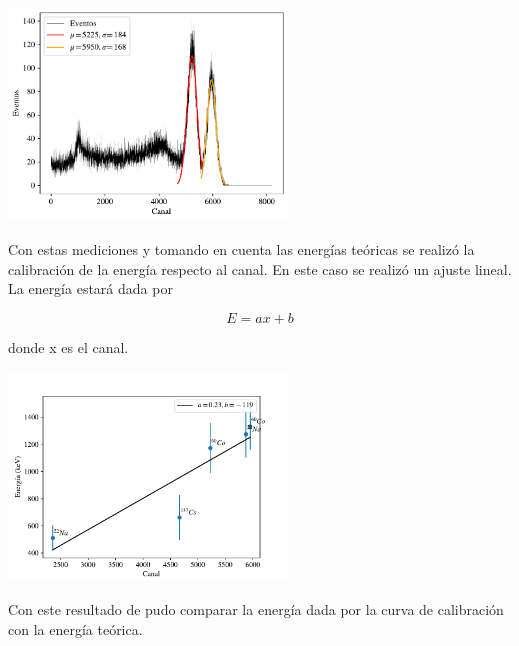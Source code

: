 \documentclass[a4paper, onecolumn]{article}
\begin{document}
		\begin{center}
			\includegraphics[width=210pt]{img/nai_33_co_60.pdf}
		\end{center}

		Con estas mediciones y tomando en cuenta las energías teóricas se realizó la calibración de la energía respecto al canal. En este caso se realizó un ajuste lineal. La energía estará dada por

		$$
		E=ax+b
		$$

		donde x es el canal.

		\begin{center}
			\includegraphics[width=210pt]{img/cal_nai_33.pdf}
		\end{center}

		Con este resultado de pudo comparar la energía dada por la curva de calibración con la energía teórica.
\end{document}
